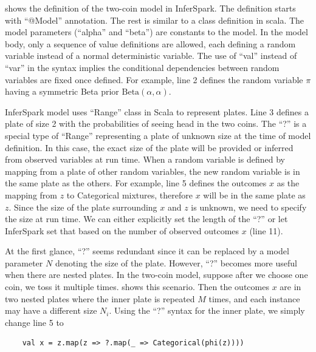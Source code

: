  shows the definition of the two-coin model
in InferSpark. The definition starts with ``{\sf @Model}'' annotation. 
The rest is similar to a class definition in
scala. The model parameters (``{\sf alpha}'' and ``{\sf beta}'') are constants to the
model. In the model body, only a sequence of value definitions are allowed,
each defining a random variable instead of a normal deterministic variable. 
The use of ``{\sf val}'' instead of ``{\sf var}'' in the syntax 
implies the conditional dependencies between random variables are fixed 
once defined. For example, line
2 defines the random variable $\pi$ having a symmetric Beta prior
$\mathrm{Beta}(\alpha, \alpha)$.

InferSpark model uses ``Range'' class in Scala to represent plates. Line 3
defines a plate of size 2 with the probabilities of seeing head in the 
two coins. The ``?'' is a special type of ``Range'' representing 
a plate of unknown size at the time of model definition. 
In this case, the exact size of the plate will be provided or inferred
from observed variables at run time.  When a random variable is
defined by mapping from a plate of other random variables, 
the new random variable is in the same plate as the others.  
For example, line 5 defines the outcomes $x$ as the mapping from $z$ 
to Categorical mixtures, therefore $x$ will be in the same plate as
$z$. Since the size of the plate surrounding $x$ and $z$ is unknown, we need
to specify the size at run time.  We can either explicitly set the length of
the ``?'' or let InferSpark set that based on the number of observed outcomes
$x$ (line 11).

At the first glance, ``?'' seems redundant since it can be replaced by a
model parameter $N$ denoting the size of the plate.  However, ``?'' becomes
more useful when there are nested plates. In the two-coin model, suppose
after we choose one coin, we toss it multiple times. 
 shows this scenario.
Then the outcomes $x$ are in two nested plates where the inner plate is
repeated $M$ times, and each instance may have
a different size $N_i$. Using the ``?'' syntax
for the inner plate, we simply change line 5 to
{\small\begin{verbatim}
	val x = z.map(z => ?.map(_ => Categorical(phi(z))))	
\end{verbatim}
}

